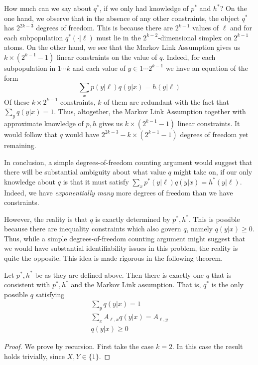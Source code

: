 \begin{itemize}
How much can we say about $q^*$, if we only had knowledge of $p^*$ and $h^*$?  On the one hand, we observe that in the absence of any other constraints, the object $q^*$ has $2^{2k-3}$ degrees of freedom.  This is because there are $2^{k-1}$ values of $\ell$ and for each subpopulation $q^*(\cdot|\ell)$ must lie in the $2^{k-2}$-dimensional simplex on $2^{k-1}$ atoms.  On the other hand, we see that the Markov Link Assumption gives us $k\times(2^{k-1}-1)$ linear constraints on the value of $q$.  Indeed, for each subpopulation in $1\cdots k$ and each value of $y \in 1 \cdots 2^{k-1}$ we have an equation of the form
\[
\sum_x p(y|\ell)q(y|x)=h(y|\ell)
\]
Of these $k\times2^{k-1}$ constraints, $k$ of them are redundant with the fact that $\sum_y q(y|x)=1$.  Thus, altogether, the Markov Link Assumption together with approximate knowledge of $p,h$ gives us $k\times(2^{k-1}-1)$ linear constraints.  It would follow that $q$ would have $2^{2k-3} - k\times(2^{k-1}-1)$ degrees of freedom yet remaining.  

In conclusion, a simple degrees-of-freedom counting argument would suggest that there will be substantial ambiguity about what value $q$ might take on, if our only knowledge about $q$ is that it must satisfy $\sum_x p^*(y|\ell)q(y|x)=h^*(y|\ell)$.  Indeed, we have \emph{exponentially many} more degrees of freedom than we have constraints.  

However, the reality is that $q$ is exactly determined by $p^*,h^*$.  This is possible because there are inequality constraints which also govern $q$, namely $q(y|x)\geq 0$.  Thus, while a simple degrees-of-freedom counting argument might suggest that we would have substantial identifiability issues in this problem, the reality is quite the opposite.  This idea is made rigorous in the following theorem.  

\begin{thm}\label{thm:miracle}
Let $p^*,h^*$ be as they are defined above.  Then there is exactly one $q$ that is consistent with $p^*,h^*$ and the Markov Link assumption.  That is, $q^*$ is the only possible $q$ satisfying
\begin{gather*}
\sum_y q(y|x)=1 \\
\sum_x A_{\ell,x}q(y|x)=A_{\ell,y}\\
q(y|x)\geq 0
\end{gather*}
\end{thm} 
\begin{proof}
We prove by recursion.  First take the case $k=2$.  In this case the result holds trivially, since $X,Y\in\{1\}$.


\end{proof}
\end{itemize}
